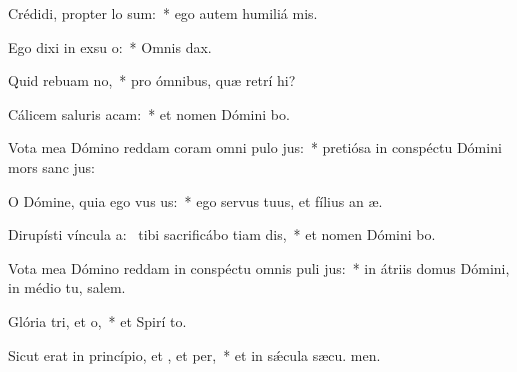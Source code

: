 \item Crédidi, propter  lo sum:~* ego autem humiliá  mis.
\item Ego dixi in exsu o:~* Omnis  dax.
\item Quid rebuam no,~* pro ómnibus, quæ retrí hi?
\item Cálicem saluris acam:~* et nomen Dómini bo.
\item Vota mea Dómino reddam coram omni pulo jus:~* pretiósa in conspéctu Dómini mors sanc jus:
\item O Dómine, quia ego vus us:~* ego servus tuus, et fílius an æ.
\item Dirupísti víncula a:~\pscross{} tibi sacrificábo tiam dis,~* et nomen Dómini bo.
\item Vota mea Dómino reddam in conspéctu omnis puli jus:~* in átriis domus Dómini, in médio tu, salem.
\item Glória tri, et o,~* et Spirí to.
\item Sicut erat in princípio, et , et per,~* et in sǽcula sæcu. men.
